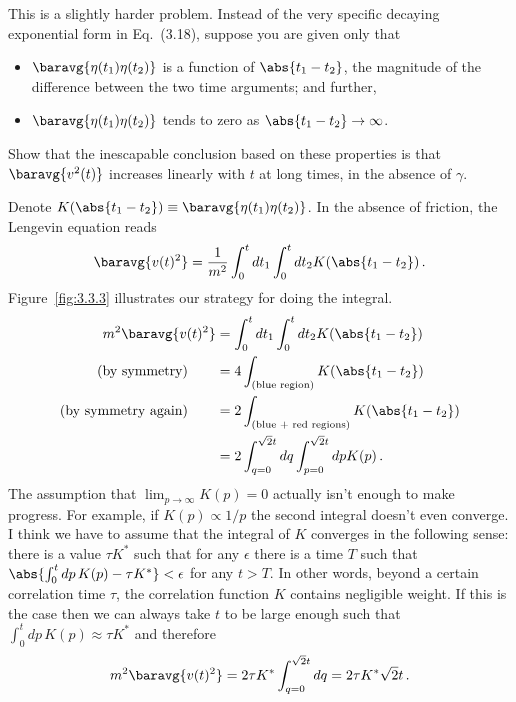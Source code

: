

This is a slightly harder problem.
Instead of the very specific decaying exponential form in Eq.~(3.18), suppose you are given only that
\begin{itemize}
  \item $\baravg{\eta(t_1)\eta(t_2)}$ is a function of $\abs{t_1-t_2}$, the magnitude of the difference between the two time arguments; and further,
  \item $\baravg{\eta(t_1)\eta(t_2)}$ tends to zero as $\abs{t_1 - t_2} \rightarrow \infty$.
\end{itemize}
Show that the inescapable conclusion based on these properties is that $\baravg{v^2(t)}$ increases linearly with $t$ at long times, in the absence of $\gamma$.


Denote $K(\abs{t_1 - t_2}) \equiv \baravg{\eta(t_1)\eta(t_2)}$.
In the absence of friction, the Lengevin equation reads
\begin{equation*}
  \baravg{v(t)^2} = \frac{1}{m^2} \int_0^t dt_1 \int_0^t dt_2 K(\abs{t_1 - t_2}) \, .
\end{equation*}
Figure~\ref{fig:3.3.3} illustrates our strategy for doing the integral.
\begin{align*}
  m^2 \baravg{v(t)^2}
  &= \int_0^t dt_1 \int_0^t dt_2 K(\abs{t_1 - t_2}) \\
  \text{(by symmetry)} \qquad &= 4 \int_\text{(blue region)} K(\abs{t_1 - t_2}) \\
  \text{(by symmetry again)} \qquad &= 2 \int_\text{(blue + red regions)} K(\abs{t_1 - t_2}) \\
  &= 2 \int_{q=0}^{\sqrt{2}t} dq \int_{p=0}^{\sqrt{2}t}dp  K(p) \, .
\end{align*}
The assumption that $\lim_{p \rightarrow \infty} K(p) = 0$ actually isn't enough to make progress.
For example, if $K(p) \propto 1/p$ the second integral doesn't even converge.
I think we have to assume that the integral of $K$ converges in the following sense: there is a value $\tau K^*$ such that for any $\epsilon$ there is a time $T$ such that $\abs{\int_0^t dp \, K(p) - \tau K^*} < \epsilon$ for any $t > T$.
In other words, beyond a certain correlation time $\tau$, the correlation function $K$ contains negligible weight.
If this is the case then we can always take $t$ to be large enough such that $\int_0^t dp \, K(p) \approx \tau K^*$ and therefore
\begin{equation*}
  m^2 \baravg{v(t)^2} = 2 \tau K^* \int_{q=0}^{\sqrt{2} t} dq = 2 \tau K^* \sqrt{2} t
  \, .
\end{equation*}

